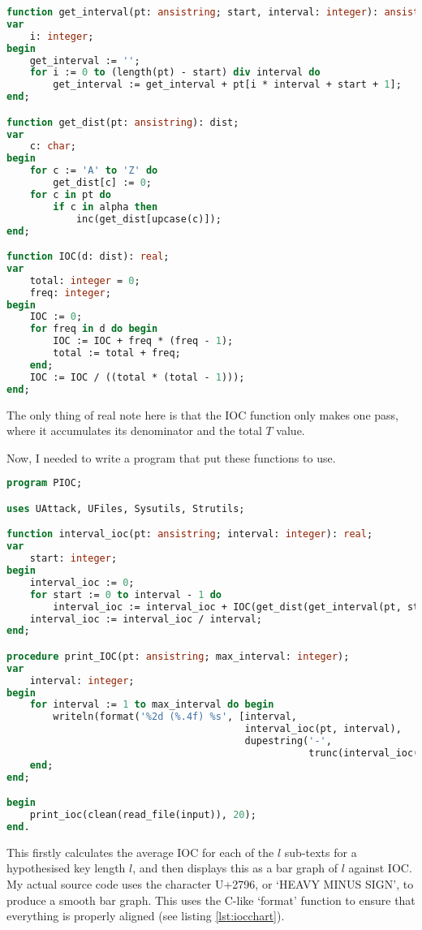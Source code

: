\documentclass{article}
\begin{document}
\begin{lstlisting}[language=Pascal, caption=The rest of the owl (IOC functions)]
function get_interval(pt: ansistring; start, interval: integer): ansistring;
var
    i: integer;
begin
    get_interval := '';
    for i := 0 to (length(pt) - start) div interval do
        get_interval := get_interval + pt[i * interval + start + 1];
end;

function get_dist(pt: ansistring): dist;
var
    c: char;
begin
    for c := 'A' to 'Z' do
        get_dist[c] := 0;
    for c in pt do
        if c in alpha then
            inc(get_dist[upcase(c)]);
end;

function IOC(d: dist): real;
var
    total: integer = 0;
    freq: integer;
begin
    IOC := 0;
    for freq in d do begin
        IOC := IOC + freq * (freq - 1);
        total := total + freq;
    end;
    IOC := IOC / ((total * (total - 1)));
end;
\end{lstlisting}

    The only thing of real note here is that the IOC function only makes one
    pass, where it accumulates its denominator and the total $T$ value.

    Now, I needed to write a program that put these functions to use.

\begin{lstlisting}[language=Pascal, caption=Command-line interface to IOC functions (PIOC.pas)]
program PIOC;

uses UAttack, UFiles, Sysutils, Strutils;

function interval_ioc(pt: ansistring; interval: integer): real;
var
    start: integer;
begin
    interval_ioc := 0;
    for start := 0 to interval - 1 do
        interval_ioc := interval_ioc + IOC(get_dist(get_interval(pt, start, interval)));
    interval_ioc := interval_ioc / interval;
end;

procedure print_IOC(pt: ansistring; max_interval: integer);
var
    interval: integer;
begin
    for interval := 1 to max_interval do begin
        writeln(format('%2d (%.4f) %s', [interval,
                                         interval_ioc(pt, interval),
                                         dupestring('-',
                                                    trunc(interval_ioc(pt, interval) * 500))]));
    end;
end;

begin
    print_ioc(clean(read_file(input)), 20);
end.
\end{lstlisting}

    This firstly calculates the average IOC for each of the $l$ sub-texts for a
    hypothesised key length $l$, and then displays this as a bar graph of $l$
    against IOC. My actual source code uses the character U+2796, or `HEAVY
    MINUS SIGN', to produce a smooth bar graph. This uses the C-like `format'
    function to ensure that everything is properly aligned (see listing
    \ref{lst:iocchart}).
\end{document}
